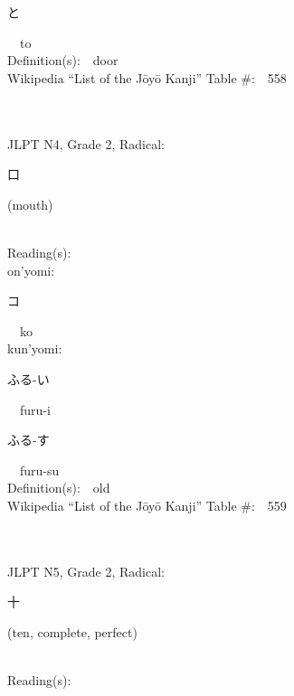 \begin{multicols}{2}
{\hspace*{2em}}{\begin{CJK}{UTF8}{min} と \end{CJK}}\ \ to\ \ \\
Definition(s):\ \ door \\
Wikipedia ``List of the J\=oy\=o Kanji'' Table \#:\ \ 558 \\
\ \ \\
{\fontsize{34pt}{40pt}  }\ \ \\  %
{JLPT N4, Grade 2, Radical:\ \ {\begin{CJK}{UTF8}{min} 口 \end{CJK}} (mouth) } \\
Reading(s):\ \ \\
{\hspace*{1em}}on'yomi:\ \ \\
{\hspace*{2em}}{\begin{CJK}{UTF8}{min} コ \end{CJK}}\ \ ko\ \ \\
{\hspace*{1em}}kun'yomi:\ \ \\
{\hspace*{2em}}{\begin{CJK}{UTF8}{min} ふる-い \end{CJK}}\ \ furu-i\ \ \\
{\hspace*{2em}}{\begin{CJK}{UTF8}{min} ふる-す \end{CJK}}\ \ furu-su\ \ \\
Definition(s):\ \ old \\
Wikipedia ``List of the J\=oy\=o Kanji'' Table \#:\ \ 559 \\
\ \ \\
{\fontsize{34pt}{40pt}  }\ \ \\  %
{JLPT N5, Grade 2, Radical:\ \ {\begin{CJK}{UTF8}{min} 十 \end{CJK}} (ten, complete, perfect) } \\
Reading(s):\ \ \\

\end{multicols}
